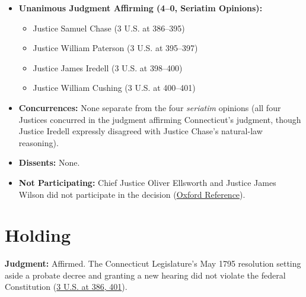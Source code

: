 \documentclass[12pt]{article}
\begin{document}
\begin{itemize}
  \item \textbf{Unanimous Judgment Affirming (4--0, Seriatim Opinions):}
  \begin{itemize}
    \item Justice Samuel Chase (3 U.S. at 386--395)
    \item Justice William Paterson (3 U.S. at 395--397)
    \item Justice James Iredell (3 U.S. at 398--400)
    \item Justice William Cushing (3 U.S. at 400--401)
  \end{itemize}
  \item \textbf{Concurrences:} None separate from the four \textit{seriatim} opinions (all four Justices concurred in the judgment affirming Connecticut's judgment, though Justice Iredell expressly disagreed with Justice Chase's natural-law reasoning).
  \item \textbf{Dissents:} None.
  \item \textbf{Not Participating:} Chief Justice Oliver Ellsworth and Justice James Wilson did not participate in the decision (\href{https://www.oxfordreference.com/display/10.1093/oi/authority.20110803095542467}{Oxford Reference}).
\end{itemize}

\section{Holding}

\textbf{Judgment:} Affirmed. The Connecticut Legislature's May 1795 resolution setting aside a probate decree and granting a new hearing did not violate the federal Constitution (\href{https://supreme.justia.com/cases/federal/us/3/386/}{3 U.S. at 386, 401}).
\end{document}
